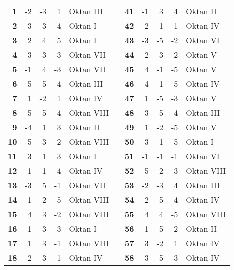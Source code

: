 \begin{longtable}[c]{rrrrlp{3.5em}rrrrl}
\textbf{1} & -2    & -3    & 1     & Oktan III &       & \textbf{41} & -1    & 3     & 4     & Oktan II\\
\textbf{2} & 3     & 3     & 4     & Oktan I &       & \textbf{42} & 2     & -1    & 1     & Oktan IV \\
\textbf{3} & 2     & 4     & 5     & Oktan I &       & \textbf{43} & -3    & -5    & -2    & Oktan VI \\
\textbf{4} & -3    & 3     & -3    & Oktan VII &       & \textbf{44} & 2     & -3    & -2    & Oktan V \\
\textbf{5} & -1    & 4     & -3    & Oktan VII &       & \textbf{45} & 4     & -1    & -5    & Oktan V \\
\textbf{6} & -5    & -5    & 4     & Oktan III &       & \textbf{46} & 4     & -1    & 5     & Oktan IV \\
\textbf{7} & 1     & -2    & 1     & Oktan IV &       & \textbf{47} & 1     & -5    & -3    & Oktan V \\
\textbf{8} & 5     & 5     & -4    & Oktan VIII &       & \textbf{48} & -3    & -5    & 4     & Oktan III \\
\textbf{9} & -4    & 1     & 3     & Oktan II &       & \textbf{49} & 1     & -2    & -5    & Oktan V \\
\textbf{10} & 5     & 3     & -2    & Oktan VIII &       & \textbf{50} & 3     & 1     & 5     & Oktan I \\
\textbf{11} & 3     & 1     & 3     & Oktan I &       & \textbf{51} & -1    & -1    & -1    & Oktan VI \\
\textbf{12} & 1     & -1    & 4     & Oktan IV &       & \textbf{52} & 5     & 2     & -3    & Oktan VIII \\
\textbf{13} & -3    & 5     & -1    & Oktan VII &       & \textbf{53} & -2    & -3    & 4     & Oktan III \\
\textbf{14} & 1     & 2     & -5    & Oktan VIII &       & \textbf{54} & 2     & -5    & 4     & Oktan IV \\
\textbf{15} & 4     & 3     & -2    & Oktan VIII &       & \textbf{55} & 4     & 4     & -5    & Oktan VIII \\
\textbf{16} & 1     & 3     & 3     & Oktan I &       & \textbf{56} & -1    & 5     & 2     & Oktan II \\
\textbf{17} & 1     & 3     & -1    & Oktan VIII &       & \textbf{57} & 3     & -2    & 1     & Oktan IV \\
\textbf{18} & 2     & -3    & 1     & Oktan IV &       & \textbf{58} & 3     & -5    & 3     & Oktan IV \\

\end{longtable}
